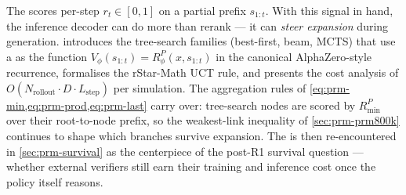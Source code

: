 The  scores per-step  $r_t \in [0, 1]$ on a partial prefix
$s_{1:t}$. With this signal in hand, the inference decoder can do
more than rerank --- it can \emph{steer expansion} during generation.
 introduces the tree-search families (best-first,
beam, MCTS) that use a  as the  function $V_\phi(s_{1:t}) =
R^P_\phi(x, s_{1:t})$ in the canonical AlphaZero-style recurrence,
formalises the rStar-Math UCT rule, and presents the cost analysis
of $O(N_\text{rollout} \cdot D \cdot L_\text{step})$ per simulation.
The aggregation rules of
\cref{eq:prm-min,eq:prm-prod,eq:prm-last} carry over: tree-search
nodes are scored by $R^P_{\min}$ over their root-to-node prefix, so
the weakest-link inequality of \cref{sec:prm-prm800k} continues to
shape which branches survive expansion. The  is then re-encountered
in \cref{sec:prm-survival} as the centerpiece of the post-R1 survival
question --- whether external verifiers still earn their training and
inference cost once the policy itself reasons.
